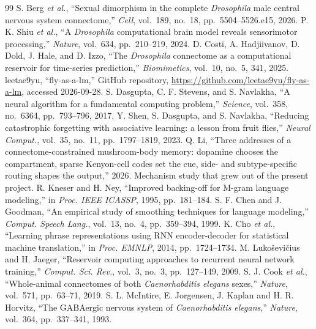 \documentclass[conference]{IEEEtran}
\begin{document}
\begin{thebibliography}{99}
 S. Berg \textit{et al.}, ``Sexual dimorphism in the
complete \textit{Drosophila} male central nervous system connectome,''
\textit{Cell}, vol.~189, no.~18, pp.~5504--5526.e15, 2026.
 P. K. Shiu \textit{et al.}, ``A \textit{Drosophila}
computational brain model reveals sensorimotor processing,'' \textit{Nature},
vol.~634, pp.~210--219, 2024.
 D. Costi, A. Hadjiivanov, D. Dold, J. Hale, and D. Izzo,
``The \textit{Drosophila} connectome as a computational reservoir for
time-series prediction,'' \textit{Biomimetics}, vol.~10, no.~5, 341, 2025.
 leetae9yu, ``fly-as-a-lm,'' GitHub repository,
\url{https://github.com/leetae9yu/fly-as-a-lm}, accessed 2026-09-28.
 S. Dasgupta, C. F. Stevens, and S. Navlakha, ``A neural
algorithm for a fundamental computing problem,'' \textit{Science}, vol.~358,
no.~6364, pp.~793--796, 2017.
 Y. Shen, S. Dasgupta, and S. Navlakha, ``Reducing
catastrophic forgetting with associative learning: a lesson from fruit
flies,'' \textit{Neural Comput.}, vol.~35, no.~11, pp.~1797--1819, 2023.
 Q. Li, ``Three addresses of a connectome-constrained
mushroom-body memory: dopamine chooses the compartment, sparse Kenyon-cell
codes set the cue, side- and subtype-specific routing shapes the output,''
2026. Mechanism study that grew out of the present project.
 R. Kneser and H. Ney, ``Improved backing-off for M-gram
language modeling,'' in \textit{Proc. IEEE ICASSP}, 1995, pp.~181--184.
 S. F. Chen and J. Goodman, ``An empirical study of
smoothing techniques for language modeling,'' \textit{Comput. Speech Lang.},
vol.~13, no.~4, pp.~359--394, 1999.
 K. Cho \textit{et al.}, ``Learning phrase representations
using RNN encoder-decoder for statistical machine translation,'' in
\textit{Proc. EMNLP}, 2014, pp.~1724--1734.
 M. Luko\v{s}evi\v{c}ius and H. Jaeger, ``Reservoir
computing approaches to recurrent neural network training,''
\textit{Comput. Sci. Rev.}, vol.~3, no.~3, pp.~127--149, 2009.
 S. J. Cook \textit{et al.}, ``Whole-animal connectomes of
both \textit{Caenorhabditis elegans} sexes,'' \textit{Nature}, vol.~571,
pp.~63--71, 2019.
 S. L. McIntire, E. Jorgensen, J. Kaplan and
H. R. Horvitz, ``The GABAergic nervous system of \textit{Caenorhabditis
elegans},'' \textit{Nature}, vol.~364, pp.~337--341, 1993.
\end{thebibliography}
\end{document}
